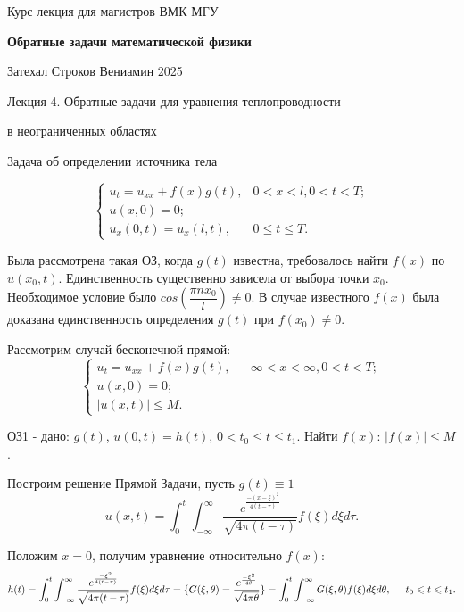 \documentclass{article}
\begin{document}
\centerline{\large Курс лекция для магистров ВМК МГУ}
\centerline {\textbf{\LARGE Обратные задачи математической физики}}
\centerline {Затехал Строков Вениамин 2025}

\vspace{0.4cm}

\centerline{\LARGE 	Лекция 4. Обратные задачи для уравнения теплопроводности}
\centerline{\LARGE 	в неограниченных областях}

\vspace{0.5cm}
\centerline{\large Задача об определении источника тела}

\begin{equation*}
\begin{cases}
	u_t = u_{xx} + f(x) g(t), & 0 < x < l, 0 < t < T;\\
	u(x,0) = 0;\\
	u_x(0,t) = u_x(l,t), & 0 \leqslant t \leqslant T.
\end{cases}
\end{equation*}

Была рассмотрена такая ОЗ, когда $g(t) $ известна, требовалось найти $f(x)$  по $u(x_0,t)$.
Единственность существенно зависела от выбора точки $x_0$. 
Необходимое условие было $cos(\dfrac{\pi n x_0}{l}) \neq 0$. 
В случае известного $f(x)$ была доказана единственность определения $g(t)$ при $f(x_0) \neq 0$.
 
Рассмотрим случай бесконечной прямой:
\begin{equation*}
\begin{cases}
	u_t = u_{xx} + f(x) g(t), & -\infty < x < \infty, 0 < t < T;\\
	u(x,0) = 0;\\
	|u(x,t)| \leqslant M.
\end{cases}
\end{equation*}

ОЗ1 - дано: $g(t)$, $u(0,t) = h(t)$, $0 < t_0 \leqslant t \leqslant t_1$. 
Найти $f(x)$: $|f(x)| \leqslant M$.

Построим решение Прямой Задачи, пусть $g(t) \equiv 1$
\begin{equation*}
u(x,t) = \int_0^t \int_{-\infty}^{\infty} \dfrac{e^{\frac{-(x-\xi)^2}{4(t-\tau)}}}{\sqrt{4 \pi (t -\tau)}}  f(\xi) d\xi d \tau.
\end{equation*}

Положим $x = 0$, получим уравнение относительно $f(x)$:
\begin{equation*}
	h(t) = \int_0^t \int_{-\infty}^{\infty} \dfrac{e^{\frac{-\xi^2}{4(t-\tau)}}}{\sqrt{4 \pi (t -\tau)}}  f(\xi) d\xi d \tau = 
	\{ G(\xi,\theta) = \dfrac{e^{\frac{-\xi^2}{4 \theta}}}{\sqrt{4 \pi \theta}} \} =
	\int_0^t \int_{-\infty}^{\infty} G(\xi, \theta) f(\xi) d\xi d \theta,
 	\hspace{0.5cm} t_0 \leqslant t \leqslant t_1.
\end{equation*}
\end{document}
